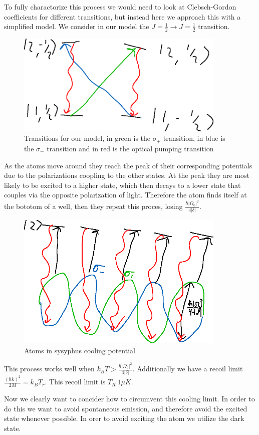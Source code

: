 To fully charactorize this process we would need to look at Clebsch-Gordon coefficients for different transitions, but instead here we approach this with a simplified model.
We consider in our model the $J=\frac{1}{2}\to J=\frac{1}{2}$ transition. 
\begin{figure}[h!]
	\centering
	\includegraphics[width=10cm]{images/12-05-1.png}
	\caption*{Transitions for our model, in green is the $\sigma_+$ transition, in blue is the $\sigma_-$ transition and in red is the optical pumping transition}
\end{figure}
As the atoms move around they reach the peak of their corresponding potentials due to the polarizations coopling to the other states.
At the peak they are most likely to be excited to a higher state, which then decays to a lower state that couples via the opposite polarization of light.
Therefore the atom finds itself at the bototom of a well, then they repeat this proces, losing $\frac{\hbar|\Omega_0|^2}{4|\delta|}$.
\begin{figure}[h!]
	\centering
	\includegraphics[width=10cm]{images/12-05-2.png}
	\caption*{Atoms in sysyphus cooling potential}
\end{figure}
This process works well when $k_B T > \frac{\hbar |\Omega_0|^2}{4|\delta|}$. Additionally we have a recoil limit $\frac{(\hbar k)^2}{2M} = k_B T_r$.
This recoil limit is $T_R~1\mu K$.

Now we clearly want to concider how to circumvent this cooling limit. In order to do this we want to avoid spontaneous emission, and therefore avoid the excited state whenever possible.
In orer to avoid exciting the atom we utilize the dark state.


